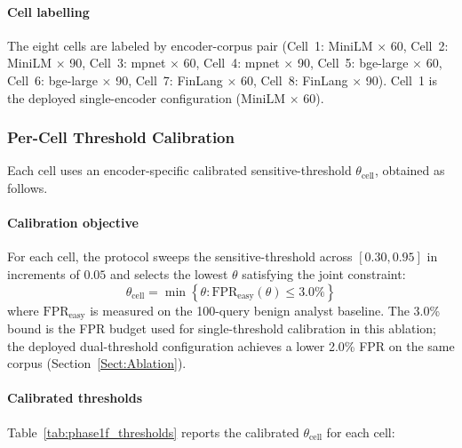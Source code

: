 \documentclass[journal]{IEEEtran}
\begin{document}
\paragraph{Cell labelling}
The eight cells are labeled by encoder-corpus pair (Cell~1: MiniLM $\times$ 60, Cell~2: MiniLM $\times$ 90, Cell~3: mpnet $\times$ 60, Cell~4: mpnet $\times$ 90, Cell~5: bge-large $\times$ 60, Cell~6: bge-large $\times$ 90, Cell~7: FinLang $\times$ 60, Cell~8: FinLang $\times$ 90). Cell~1 is the deployed single-encoder configuration (MiniLM $\times$ 60).

\subsubsection{Per-Cell Threshold Calibration}
\label{Sect:V_A_3_Calibration}

Each cell uses an encoder-specific calibrated sensitive-threshold $\theta_{\text{cell}}$, obtained as follows.

\paragraph{Calibration objective}
For each cell, the protocol sweeps the sensitive-threshold across $[0.30, 0.95]$ in increments of $0.05$ and selects the lowest $\theta$ satisfying the joint constraint:
\begin{equation}
\theta_{\text{cell}} = \min \left\{ \theta : \text{FPR}_{\text{easy}}(\theta) \leq 3.0\% \right\}
\label{eq:m35_threshold}
\end{equation}
where $\text{FPR}_{\text{easy}}$ is measured on the 100-query benign analyst baseline. The 3.0\% bound is the FPR budget used for single-threshold calibration in this ablation; the deployed dual-threshold configuration achieves a lower 2.0\% FPR on the same corpus (Section~\ref{Sect:Ablation}).

\paragraph{Calibrated thresholds}
Table~\ref{tab:phase1f_thresholds} reports the calibrated $\theta_{\text{cell}}$ for each cell:
\end{document}
